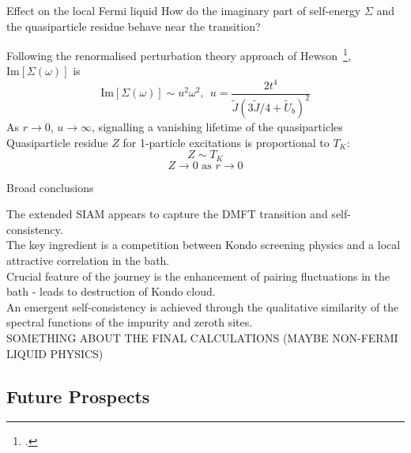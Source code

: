 \documentclass[8pt,aspectratio=169]{beamer}
\begin{document}
\begin{frame}{Effect on the local Fermi liquid}
	How do the imaginary part of \alert{self-energy} \(\Sigma\) and the \alert{quasiparticle residue} behave near the transition?
	\vspace*{\fill}

\begin{itemize}
	\nitem Following the renormalised perturbation theory approach of Hewson~\footcite{hewson1993,coleman2015}, \(\text{Im}\left[\Sigma(\omega)\right] \) is
	\[\text{Im}\left[\Sigma(\omega)\right] \sim u^2 \omega^2, ~ ~ u = \frac{2t^4}{\tilde J\left(3\tilde J/4 + \tilde U_b \right)^2}\]
	\nitem As \(r \to 0\), \(u \to \infty\), signalling a vanishing lifetime of the quasiparticles\\[10pt]
	\nitem Quasiparticle residue \(Z\) for 1-particle excitations is proportional to \(T_K\):
	\[Z \sim T_K\]
	\[Z \to 0 \text{ as }r \to 0\]
\end{itemize}
\end{frame}


\begin{frame}{Broad conclusions}
\begin{itemize}
	\nitem The extended SIAM appears to capture the DMFT transition and \alert{self-consistency}.\\[10pt]
	\nitem The key ingredient is a \alert{competition} between Kondo screening physics and a local attractive correlation in the bath.\\[10pt]
	\nitem Crucial feature of the journey is the enhancement of \alert{pairing fluctuations} in the bath - leads to destruction of Kondo cloud.\\[10pt]
	\nitem An emergent self-consistency is achieved through the qualitative similarity of the spectral functions of the impurity and zeroth sites.\\[10pt]
	\nitem  SOMETHING ABOUT THE FINAL CALCULATIONS (MAYBE NON-FERMI LIQUID PHYSICS)
\end{itemize}	
\end{frame}

\begin{frame}{}
\section{Future Prospects}
\end{frame}
\end{document}
